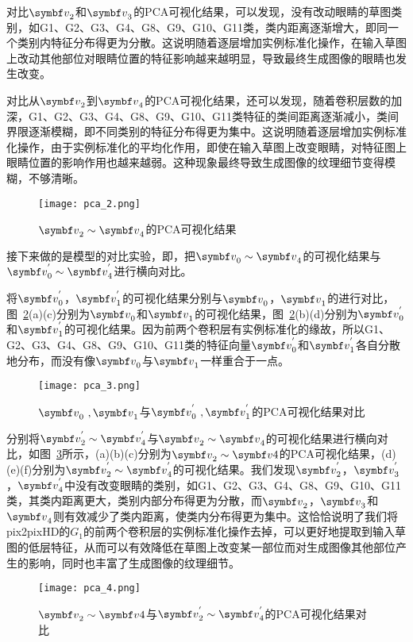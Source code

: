 对比$\vv_2$和$\vv_3$的PCA可视化结果，可以发现，没有改动眼睛的草图类别，如G1、G2、G3、G4、G8、G9、G10、G11类，类内距离逐渐增大，即同一个类别内特征分布得更为分散。这说明随着逐层增加实例标准化操作，在输入草图上改动其他部位对眼睛位置的特征影响越来越明显，导致最终生成图像的眼睛也发生改变。

对比从$\vv_2$到$\vv_4$的PCA可视化结果，还可以发现，随着卷积层数的加深，G1、G2、G3、G4、G8、G9、G10、G11类特征的类间距离逐渐减小，类间界限逐渐模糊，即不同类别的特征分布得更为集中。这说明随着逐层增加实例标准化操作，由于实例标准化的平均化作用，即使在输入草图上改变眼睛，对特征图上眼睛位置的影响作用也越来越弱。这种现象最终导致生成图像的纹理细节变得模糊，不够清晰。
\begin{figure}[htb]
	\centering
	\texttt{[image: pca\_2.png]}
	\caption{$\vv_2 \sim \vv_4$的PCA可视化结果}
	\label{fig:pca_2}
\end{figure}

接下来做的是模型的对比实验，即，把$\vv_0 \sim \vv_4$的可视化结果与$\vv_0^{'} \sim \vv_4^{'}$进行横向对比。

将$\vv_0^{'}$，$\vv_1^{'}$的可视化结果分别与$\vv_0$，$\vv_1$的进行对比，图~\ref{fig:pca_3}(a)(c)分别为$\vv_0$和$\vv_1$的可视化结果，图~\ref{fig:pca_3}(b)(d)分别为$\vv_0^{'}$和$\vv_1^{'}$的可视化结果。因为前两个卷积层有实例标准化的缘故，所以G1、G2、G3、G4、G8、G9、G10、G11类的特征向量$\vv_0^{'}$和$\vv_1^{'}$各自分散地分布，而没有像$\vv_0$与$\vv_1$一样重合于一点。
\begin{figure}[htb]
	\centering
	\texttt{[image: pca\_3.png]}
	\caption{$\vv_0\ ,\vv_1$与$\vv_0^{'}\ ,\vv_1^{'}$的PCA可视化结果对比}
	\label{fig:pca_3}
\end{figure}

分别将$\vv_2^{'} \sim \vv_4^{'}$与$\vv_2 \sim \vv_4$的可视化结果进行横向对比，如图~\ref{fig:pca_4}所示，(a)(b)(c)分别为$\vv_2 \sim \vv4$的PCA可视化结果，(d)(e)(f)分别为$\vv_2^{'} \sim \vv_4^{'}$的可视化结果。我们发现$\vv_2^{'}$，$\vv_3^{'}$，$\vv_4^{'}$中没有改变眼睛的类别，如G1、G2、G3、G4、G8、G9、G10、G11类，其类内距离更大，类别内部分布得更为分散，而$\vv_2$，$\vv_3$和$\vv_4$则有效减少了类内距离，使类内分布得更为集中。这恰恰说明了我们将pix2pixHD的$G_1$的前两个卷积层的实例标准化操作去掉，可以更好地提取到输入草图的低层特征，从而可以有效降低在草图上改变某一部位而对生成图像其他部位产生的影响，同时也丰富了生成图像的纹理细节。
\begin{figure}[htb]
	\centering
	\texttt{[image: pca\_4.png]}
	\caption{$\vv_2 \sim \vv4$与$\vv_2^{'} \sim \vv_4^{'}$的PCA可视化结果对比}
	\label{fig:pca_4}
\end{figure}



